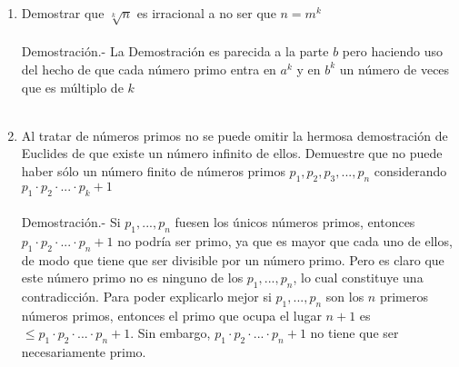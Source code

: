 \begin{enumerate}
\begin{enumerate}[\bfseries a)]
      \item Demostrar que $\sqrt[k]{n}$ es irracional a no ser que $n=m^k$\\\\
      Demostración.- \; La Demostración es parecida a la parte $b$ pero haciendo uso del hecho de que cada número primo entra en $a^k$ y en $b^k$ un número de veces que es múltiplo de $k$\\\\   

      \item Al tratar de números primos no se puede omitir la hermosa demostración de Euclides de que existe un número infinito de ellos. Demuestre que no puede haber sólo un número finito de números primos $p_1, p_2, p_3,...,p_n$ considerando $p_1\cdot p_2 \cdot ... \cdot p_k + 1$\\\\
      Demostración.- \; Si $p_1,...,p_n$ fuesen los únicos números primos, entonces $p_1 \cdot p_2 \cdot ... \cdot p_n + 1$ no podría ser primo, ya que es mayor que cada uno de ellos, de modo que tiene que ser divisible por un número primo. Pero es claro que este número primo no es ninguno de los $p_1,...,p_n$, lo cual constituye una contradicción. Para poder explicarlo mejor si $p_1,...,p_n$ son los $n$ primeros números primos, entonces el primo que ocupa el lugar $n+1$ es $\leq p_1 \cdot p_2 \cdot ... \cdot p_n+1$. Sin embargo, $p_1\cdot p_2 \cdot ...\cdot p_n + 1$ no tiene que ser necesariamente primo.\\\\       
      

\end{enumerate}
\end{enumerate}

